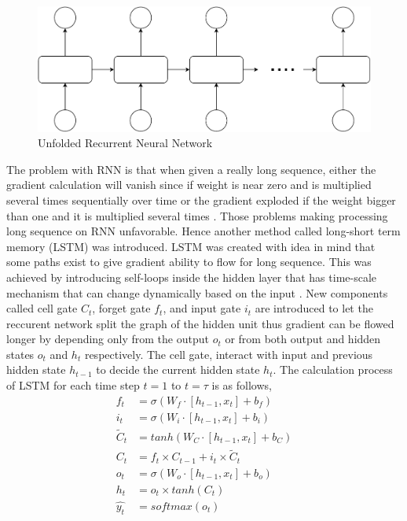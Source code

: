     \begin{figure}
        \centering
        \includegraphics[width=.5\linewidth]{images/unfolded_rnn.pdf}
        \caption{Unfolded Recurrent Neural Network}
        \label{fig:unfolded_rnn}
    \end{figure}

    The problem with RNN is that when given a really long sequence,
    either the gradient calculation will vanish since if weight is
    near zero and is multiplied several times sequentially over time
    or the gradient exploded if the weight bigger than one and it is
    multiplied several times \citep{Goodfellow-et-al-2016}. Those
    problems making processing long sequence on RNN unfavorable. Hence
    another method called long-short term memory (LSTM) was
    introduced. LSTM was created with idea in mind that some paths
    exist to give gradient ability to flow for long sequence. This was
    achieved by introducing self-loops inside the hidden layer that
    has time-scale mechanism that can change dynamically based on the
    input \citep{Goodfellow-et-al-2016}. New components called cell
    gate $C_t$, forget gate $f_t$, and input gate $i_t$ are introduced
    to let the reccurent network split the graph of the hidden unit
    thus gradient can be flowed longer by depending only from the
    output $o_t$ or from both output and hidden states $o_t$ and $h_t$
    respectively. The cell gate, interact with input and previous
    hidden state $h_{t-1}$ to decide the current hidden state $h_t$.
    The calculation process of LSTM for each time step $t=1$ to
    $t=\tau$ is as follows,
    \begin{align}
        \label{eq:lstm:f_t}
        f_t &= \sigma(W_f \cdot [h_{t-1}, x_t] + b_f) \\
        \label{eq:lstm:i_t}    
        i_t &= \sigma(W_i \cdot [h_{t-1}, x_t] + b_i) \\
        \label{eq:lstm:Cc_t}
        \tilde{C}_t &= tanh(W_C \cdot [h_{t-1}, x_t] + b_C) \\
        \label{eq:lstm:C_t}
        C_t &= f_t \times C_{t-1} + i_t \times \tilde{C}_t \\
        \label{eq:lstm:o_t}
        o_t &= \sigma(W_o \cdot [h_{t-1}, x_t] + b_o) \\
        \label{eq:lstm:h_t}
        h_t &= o_t \times tanh(C_t) \\
        \label{eq:lstm:y_t}
        \hat{y_t} &= softmax(o_t)
    \end{align}

